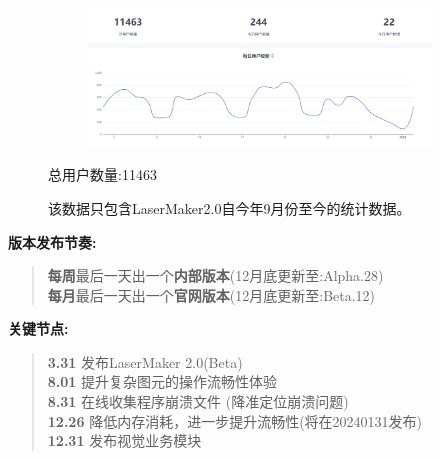 \documentclass[AutoFakeBold,AutoFakeSlant]{beamer}
\begin{document}
	\begin{frame}[fragile]
	\begin{figure}
		\centering %
		\begin{subfigure}{\linewidth}
			\includegraphics[width=\linewidth]{users_numbers}
		\end{subfigure} 
		
		\begin{minipage}[l]{0.3\linewidth}
			\large
			总用户数量:11463
		\end{minipage}\hfill
		\begin{minipage}[l]{0.6\linewidth}
			\footnotesize
			\linespread{1.6} \selectfont
			该数据只包含LaserMaker2.0自今年9月份至今的统计数据。
		\end{minipage}
	\end{figure}
	\end{frame}
	
	\begin{frame}[fragile]
		\large
		\linespread{1.6}
		\selectfont
		\textbf{版本发布节奏:}
		\begin{quote}
			\textbf{每周}最后一天出一个\textbf{内部版本}{\tiny (12月底更新至:Alpha.28)}\\
			\textbf{每月}最后一天出一个\textbf{官网版本}{\tiny (12月底更新至:Beta.12)}
		\end{quote}
		
		\bigskip
		\bigskip
		
		\large
		\linespread{1.6}
		\selectfont
		\textbf{关键节点:}
		\begin{quote}
		\textbf{3.31} {\large 发布LaserMaker 2.0(Beta)} \\
		\textbf{8.01} {\large 提升复杂图元的操作流畅性体验} \\
		\textbf{8.31} {\large 在线收集程序崩溃文件} {\tiny (降准定位崩溃问题)} \\
		\textbf{12.26} {\large 降低内存消耗，进一步提升流畅性}{\tiny (将在20240131发布)} \\
		\textbf{12.31} 发布视觉业务模块
		\end{quote}
	\end{frame}
	
\end{document}
